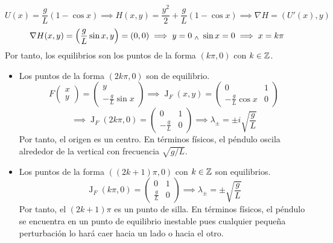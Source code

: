 

\begin{ejer}
	\[U(x) = \frac{g}{L} (1-\cos{x}) \implies H(x, y) = \frac{y^2}{2} + \frac{g}{L} (1-\cos{x}) \implies \nabla H = \left(U'(x), y\right)\]
	\[\nabla H(x, y) = \left(\frac{g}{L} \sin{x}, y\right) = (0, 0) \implies y = 0 \; _{\wedge} \; \sin{x} = 0 \implies x = k\pi\]
	Por tanto, los equilibrios son los puntos de la forma $(k\pi, 0)$ con $k\in\mathbb{Z}$.
	\begin{itemize}
		\item Los puntos de la forma $(2k\pi, 0)$ son de equilibrio.
		      \[F\begin{pmatrix} x \\ y \end{pmatrix} = \begin{pmatrix} y \\ -\frac{g}{L}\sin{x} \end{pmatrix} \implies \operatorname{J}_F(x, y) = \begin{pmatrix} 0 & 1 \\ -\frac{g}{L}\cos{x} & 0 \end{pmatrix}\]
		      \[\implies \operatorname{J}_F(2k\pi, 0) = \begin{pmatrix} 0 & 1 \\ -\frac{g}{L} & 0 \end{pmatrix} \implies \lambda_{\pm} = \pm i \sqrt{\frac{g}{L}}\]
		      Por tanto, el origen es un centro. En términos físicos, el péndulo oscila alrededor de la vertical con frecuencia $\sqrt{g/L}$.
		\item Los puntos de la forma $((2k+1)\pi, 0)$ con $k\in\mathbb{Z}$ son equilibrios.
		      \[\operatorname{J}_F(k\pi, 0) = \begin{pmatrix} 0 & 1 \\ \frac{g}{L} & 0 \end{pmatrix} \implies \lambda_{\pm} = \pm \sqrt{\frac{g}{L}}\]
		      Por tanto, el $(2k+1)\pi$ es un punto de silla. En términos físicos, el péndulo se encuentra en un punto de equilibrio inestable pues cualquier pequeña perturbación lo hará caer hacia un lado o hacia el otro.
	\end{itemize}
	\begin{center}

\end{center}
\end{ejer}
